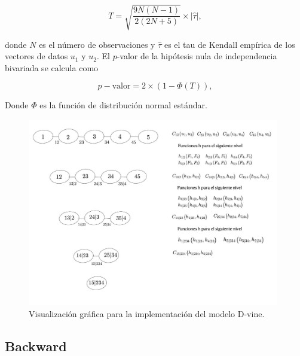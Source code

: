 \begin{equation}\label{T}
    T = \sqrt{\frac{9N(N - 1)}{2(2N + 5)}} \times |\hat{\tau}|,
\end{equation}

donde $N$ es el número de observaciones y $\hat{\tau}$ es el tau de Kendall empírica de los vectores de datos $u_1$ y $u_2$. El $p$-valor de la hipótesis nula de independencia bivariada se calcula como

\begin{equation}
    p-\text{valor} = 2 \times \left(1 - \Phi\left(T\right)\right),
\end{equation}


Donde $\Phi$ es la función de distribución normal estándar.

\begin{figure}[H]
    \centering
    \includegraphics[height = 13 cm, width = 0.98\textwidth]{Imagenes/Construccion.jpeg}
    \caption{Visualización gráfica para la implementación del modelo D-vine.}
    \label{fig:construccion}
\end{figure}


\subsection{Backward}

